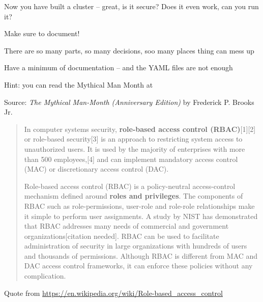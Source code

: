 \documentclass[Screen16to9,17pt]{foils}
\begin{document}
Now you have built a cluster -- great, is it secure? Does it even work, can you run it?




\begin{list2}
\item Make sure to document!
\item There are so many parts, so many decisions, soo many places thing can mess up
\item Have a minimum of documentation -- and the YAML files are not enough
\item Hint:  you can read the Mythical Man Month at 
\end{list2}


Source: \emph{The Mythical Man-Month (Anniversary Edition)}
by Frederick P. Brooks Jr.

\begin{list2}
    \item
\end{list2}


\begin{quote}
In computer systems security, {\bf role-based access control (RBAC)}[1][2] or role-based security[3] is an approach to restricting system access to unauthorized users. It is used by the majority of enterprises with more than 500 employees,[4] and can implement mandatory access control (MAC) or discretionary access control (DAC).

Role-based access control (RBAC) is a policy-neutral access-control mechanism defined around {\bf roles and privileges}. The components of RBAC such as role-permissions, user-role and role-role relationships make it simple to perform user assignments. A study by NIST has demonstrated that RBAC addresses many needs of commercial and government organizations[citation needed]. RBAC can be used to facilitate administration of security in large organizations with hundreds of users and thousands of permissions. Although RBAC is different from MAC and DAC access control frameworks, it can enforce these policies without any complication.
\end{quote}
Quote from \url{https://en.wikipedia.org/wiki/Role-based_access_control}
\end{document}
